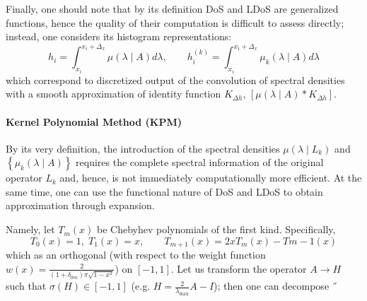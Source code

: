 Finally, one should note that by its definition DoS and LDoS  are generalized functions, hence the quality of their computation is difficult to assess directly; instead, one considers its histogram representations:
\begin{equation}
    h_i = \int_{x_i}^{x_i+\Delta_x} \mu( \lambda \mid A ) d\lambda, \qquad h^{(k)}_i = \int_{x_i}^{x_i+\Delta_x} \mu_k( \lambda \mid A ) d\lambda 
\end{equation}
which correspond to discretized output of the convolution of spectral densities with a smooth approximation of identity function \( K_{\Delta h} \), \( \left[ \mu(\lambda \mid A ) * K_{\Delta h }  \right]\).

\paragraph{ Kernel Polynomial Method (KPM) }
%
%

By its very definition, the introduction of the spectral densities \( \mu(\lambda \mid L_k ) \) and \( \left\{ \mu_k(\lambda \mid A ) \right\}\) requires the complete spectral information of the original operator \( L_k \) and, hence, is not immediately computationally more efficient. At the same time, one can use the functional nature of DoS and LDoS to obtain approximation through expansion.

Namely, let \( T_m(x)\) be Chebyhev polynomials of the first kind. Specifically,
\begin{equation}
      T_0(x) = 1, \; T_1(x) = x, \qquad T_{m+1}(x) = 2x T_m(x) - T{m-1} (x)
\end{equation}
which as an orthogonal (with respect to the weight function \(w(x) = \frac{2}{(1+\delta_{0m}) \pi \sqrt{1-x^2}}\)) on \( [-1, 1 ]\). Let us transform the operator \( A \to H  \) such that \( \sigma(H) \in [-1, 1]\) (e.g. \( H = \frac{2}{\lambda_{\max{}}} A - I\)); then one can decompose ˝









